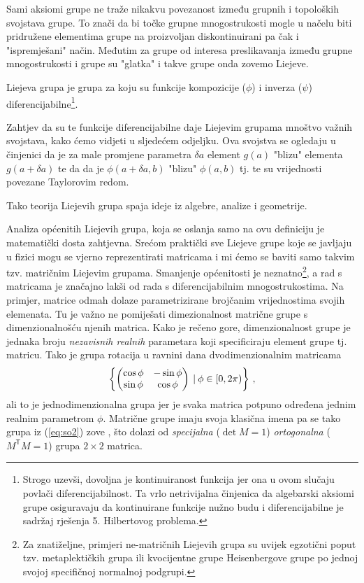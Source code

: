 Sami aksiomi grupe ne traže nikakvu povezanost između grupnih i topoloških
svojstava grupe. To znači da bi točke grupne mnogostrukosti mogle u načelu biti
pridružene elementima grupe na proizvoljan diskontinuirani pa čak i "ispremješani"
način. Međutim za grupe od interesa preslikavanja između grupne mnogostrukosti
i grupe su "glatka" i takve grupe onda zovemo Liejeve.

\begin{definicija}
  Liejeva grupa je grupa za koju su funkcije kompozicije
($\phi$) i inverza ($\psi$) diferencijabilne\footnote{Strogo uzevši, 
    dovoljna je kontinuiranost funkcija jer ona u ovom slučaju povlači diferencijabilnost.
 Ta vrlo netrivijalna činjenica da algebarski aksiomi
 grupe osiguravaju da kontinuirane funkcije nužno budu i diferencijabilne
 je sadržaj rješenja 5. Hilbertovog problema.}.
\end{definicija}

Zahtjev da su te funkcije diferencijabilne daje Liejevim grupama mnoštvo važnih svojstava,
kako ćemo vidjeti u sljedećem odjeljku.
Ova svojstva se ogledaju
u činjenici da je za male promjene parametra $\delta a$
element $g(a)$ "blizu" elementa $g(a+\delta a)$ te da
da je $\phi(a+\delta a, b)$
"blizu" $\phi(a,b)$ tj. te su vrijednosti povezane Taylorovim redom.\\
\centerline{}
Tako teorija Liejevih grupa spaja ideje iz algebre, analize i geometrije.

Analiza općenitih Liejevih grupa, koja se oslanja samo na ovu definiciju
je matematički dosta zahtjevna. Srećom praktički sve Liejeve grupe koje se javljaju
u fizici mogu se vjerno reprezentirati matricama i mi ćemo se baviti
samo takvim tzv. matričnim Liejevim grupama. Smanjenje općenitosti je neznatno\footnote{Za
    znatiželjne, primjeri ne-matričnih Liejevih grupa su uvijek egzotični
    poput tzv. metaplektičkih grupa ili kvocijentne grupe Heisenbergove grupe po
jednoj svojoj specifičnoj normalnoj podgrupi.\label{fus:nematricne}},
a rad s matricama je značajno lakši od rada s diferencijabilnim mnogostrukostima.
Na primjer, matrice odmah dolaze parametrizirane brojčanim vrijednostima svojih
elemenata. Tu je važno
ne pomiješati dimezionalnost matrične grupe s dimenzionalnošću njenih matrica.
Kako je rečeno gore, dimenzionalnost grupe je jednaka broju \emph{nezavisnih realnih}
parametara koji specificiraju element grupe tj. matricu. Tako je grupa rotacija
u ravnini dana dvodimenzionalnim matricama
\begin{equation}
    \left\{ \begin{pmatrix}
        \cos\phi & -\sin\phi \\
        \sin\phi & \cos\phi 
    \end{pmatrix} 
     \: | \: \phi \in [0, 2\pi) \right\} \,,
    \label{eq:so2}
\end{equation}
ali to je jednodimenzionalna grupa jer je svaka matrica potpuno određena
jednim realnim parametrom $\phi$. Matrične grupe imaju svoja klasična
imena pa se tako grupa iz (\ref{eq:so2}) zove , što dolazi
od \emph{specijalna} ($\det M = 1$) \emph{ortogonalna} ($M^\mathsf{T} M = 1$) 
grupa $2\times 2$ matrica.


